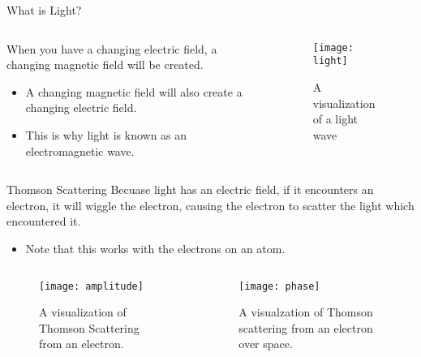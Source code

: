 \documentclass[aspectratio=169]{beamer}
\begin{document}
\begin{frame}{What is Light?}
\begin{columns}
				
	\begin{column}[b]{.5\textwidth}
		When you have a changing electric field, a changing magnetic field will be created.
		\begin{itemize}
			\item A changing magnetic field will also create a changing electric field.
			\item This is why light is known as an electromagnetic wave.
		\end{itemize}		
	\end{column}
				
	\begin{column}{.5\textwidth}
		\begin{figure}
			\texttt{[image: light]}
			\caption{A visualization of a light wave}
		\end{figure}
	\end{column}
				
\end{columns}
\end{frame}

\begin{frame}{Thomson Scattering}
	Becuase light has an electric field, if it encounters an electron, it will wiggle the electron, causing the electron to scatter the light which encountered it.
	\begin{itemize}
		\item Note that this works with the electrons on an atom.
	\end{itemize}
	\begin{columns}
		\begin{column}{.5\textwidth}
			\begin{figure}
				\texttt{[image: amplitude]}
				\caption {A visualization of Thomson Scattering from an electron.}
			\end{figure}
		\end{column}
		
		\begin{column}{.5\textwidth}
			\begin{figure}
				\texttt{[image: phase]}
				\caption {A visualzation of Thomson scattering from an electron over space.}
			\end{figure}
		\end{column}
	\end{columns}
\end{frame}
		
\end{document}
